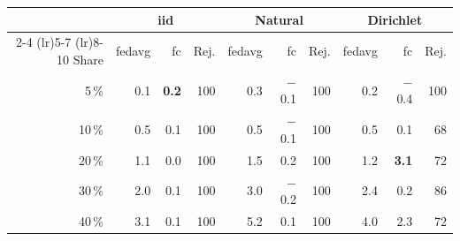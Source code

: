 \begin{tabular}{rrrrrrrrrr}
\toprule
 & \multicolumn{3}{c}{\gls{iid}} & \multicolumn{3}{c}{Natural} & \multicolumn{3}{c}{Dirichlet} \\
\cmidrule(lr){2-4} \cmidrule(lr){5-7} \cmidrule(lr){8-10}
Share & \gls{fedavg} & \gls{fc} & Rej. & \gls{fedavg} & \gls{fc} & Rej. & \gls{fedavg} & \gls{fc} & Rej. \\
\midrule
5\,\% & 0.1 & \textbf{0.2} & 100 & 0.3 & $-$0.1 & 100 & 0.2 & $-$0.4 & 100 \\
10\,\% & 0.5 & 0.1 & 100 & 0.5 & $-$0.1 & 100 & 0.5 & 0.1 & 68 \\
20\,\% & 1.1 & 0.0 & 100 & 1.5 & 0.2 & 100 & 1.2 & \textbf{3.1} & 72 \\
30\,\% & 2.0 & 0.1 & 100 & 3.0 & $-$0.2 & 100 & 2.4 & 0.2 & 86 \\
40\,\% & 3.1 & 0.1 & 100 & 5.2 & 0.1 & 100 & 4.0 & 2.3 & 72 \\
\bottomrule
\end{tabular}
